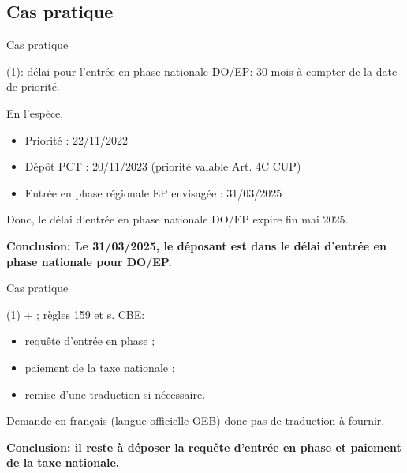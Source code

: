 
\subsection{Cas pratique}

\begin{frame}{Cas pratique}

\begin{block}{}
(1):
délai pour l'entrée en phase nationale DO/EP: 30 mois à compter de la date de priorité.
\end{block}

En l'espèce,
\begin{itemize}
  \item Priorité : 22/11/2022
  \item Dépôt PCT : 20/11/2023 (priorité valable Art. 4C CUP)
  \item Entrée en phase régionale EP envisagée : 31/03/2025
\end{itemize}

Donc, le délai d'entrée en phase nationale DO/EP
expire fin mai 2025.\newline

\textbf{Conclusion: Le 31/03/2025, le déposant
est dans le délai d'entrée en phase nationale
pour DO/EP.}

\end{frame}

\begin{frame}{Cas pratique}

\begin{block}{}
(1) +  ; règles 159 et s. CBE:
\begin{itemize}
  \item requête d’entrée en phase ;
  \item paiement de la taxe nationale ;
  \item remise d’une traduction si nécessaire.
\end{itemize}
\end{block}

Demande en français (langue officielle OEB) donc pas de traduction à fournir.\newline

\textbf{Conclusion: il reste à déposer la requête d'entrée en phase et paiement de la taxe nationale.}

\end{frame}

